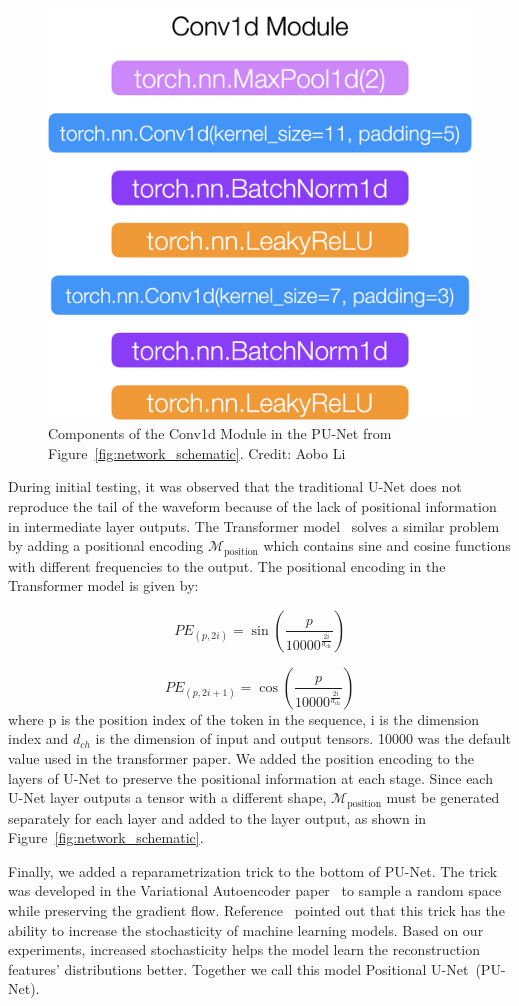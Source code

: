 \begin{figure}[htb!]
    \centering
    \includegraphics[width=0.3\linewidth,trim={0pc 0pc 0pc 0pc},clip]{ch6/figs/conv1d.png}
    \caption{Components of the Conv1d Module in the PU-Net from Figure~\ref{fig:network_schematic}.  Credit: Aobo Li}
    \label{ch6:fig:cov1d_break_down}
\end{figure}

During initial testing, it was observed that the traditional U-Net does not reproduce the tail of the waveform because of the lack of positional information in intermediate layer outputs. The Transformer model~\cite{Transformer} solves a similar problem by adding a positional encoding $\mathcal{M}_{\mathrm{position}}$ which contains sine and cosine functions with different frequencies to the output. The positional encoding in the Transformer model is given by:

\begin{equation}
PE_{(p, 2i)} = \sin\left(\frac{p}{10000^{\frac{2i}{d_{\text{ch}}}}}\right)
\label{eqn:positional_encoding_sin}
\end{equation}

\begin{equation}
PE_{(p, 2i+1)} = \cos\left(\frac{p}{10000^{\frac{2i}{d_{\text{ch}}}}}\right)
\label{eqn:positional_encoding_cos}
\end{equation}
where p is the position index of the token in the sequence, i is the dimension index and $d_{ch}$ is the dimension of input and output tensors. 10000 was the default value used in the transformer paper. We added the position encoding to the layers of U-Net to preserve the positional information at each stage. Since each U-Net layer outputs a tensor with a different shape, $\mathcal{M}_{\mathrm{position}}$ must be generated separately for each layer and added to the layer output, as shown in Figure~\ref{fig:network_schematic}.



Finally, we added a reparametrization trick to the bottom of PU-Net. The trick was developed in the Variational Autoencoder paper~\cite{VAE} to sample a random space while preserving the gradient flow. Reference~\cite{AAE} pointed out that this trick has the ability to increase the stochasticity of machine learning models. Based on our experiments, increased stochasticity helps the model learn the reconstruction features' distributions better. Together we call this model Positional U-Net~(PU-Net).

